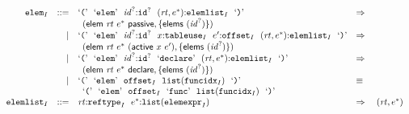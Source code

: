 $$
\begin{array}[t]{@{}lrrl@{}l@{}l@{}l@{}}
& {{\mathtt{elem}}}_{I} & ::= & \mbox{‘\texttt{{(}}’}~~\mbox{‘\texttt{elem}’}~~{{\mathit{id}}^?}{:}{{\mathtt{id}}^?}~~({\mathit{rt}}, {e^\ast}){:}{{\mathtt{elemlist}}}_{I}~~\mbox{‘\texttt{{)}}’} & \quad\Rightarrow\quad{} & & \\
&&& \multicolumn{4}{@{}l@{}}{\quad
\begin{array}[t]{@{}l@{}}
(\mathsf{elem}~{\mathit{rt}}~{e^\ast}~\mathsf{passive}, \{ \mathsf{elems}~({{\mathit{id}}^?}) \}) \\
\end{array}
} \\
& & | & \mbox{‘\texttt{{(}}’}~~\mbox{‘\texttt{elem}’}~~{{\mathit{id}}^?}{:}{{\mathtt{id}}^?}~~x{:}{{\mathtt{tableuse}}}_{I}~~{e'}{:}{{\mathtt{offset}}}_{I}~~({\mathit{rt}}, {e^\ast}){:}{{\mathtt{elemlist}}}_{I}~~\mbox{‘\texttt{{)}}’} & \quad\Rightarrow\quad{} & & \\
&&& \multicolumn{4}{@{}l@{}}{\quad
\begin{array}[t]{@{}l@{}}
(\mathsf{elem}~{\mathit{rt}}~{e^\ast}~(\mathsf{active}~x~{e'}), \{ \mathsf{elems}~({{\mathit{id}}^?}) \}) \\
\end{array}
} \\
& & | & \mbox{‘\texttt{{(}}’}~~\mbox{‘\texttt{elem}’}~~{{\mathit{id}}^?}{:}{{\mathtt{id}}^?}~~\mbox{‘\texttt{declare}’}~~({\mathit{rt}}, {e^\ast}){:}{{\mathtt{elemlist}}}_{I}~~\mbox{‘\texttt{{)}}’} & \quad\Rightarrow\quad{} & & \\
&&& \multicolumn{4}{@{}l@{}}{\quad
\begin{array}[t]{@{}l@{}}
(\mathsf{elem}~{\mathit{rt}}~{e^\ast}~\mathsf{declare}, \{ \mathsf{elems}~({{\mathit{id}}^?}) \}) \\
\end{array}
} \\
& & | & \mbox{‘\texttt{{(}}’}~~\mbox{‘\texttt{elem}’}~~{{\mathtt{offset}}}_{I}~~{\mathtt{list}}({{\mathtt{funcidx}}}_{I})~~\mbox{‘\texttt{{)}}’} & \quad\equiv\quad{} & & \\
&&& \multicolumn{4}{@{}l@{}}{\quad
\begin{array}[t]{@{}l@{}}
\mbox{‘\texttt{{(}}’}~~\mbox{‘\texttt{elem}’}~~{{\mathtt{offset}}}_{I}~~\mbox{‘\texttt{func}’}~~{\mathtt{list}}({{\mathtt{funcidx}}}_{I})~~\mbox{‘\texttt{{)}}’} \\
\end{array}
} \\
& {{\mathtt{elemlist}}}_{I} & ::= & {\mathit{rt}}{:}{{\mathtt{reftype}}}_{I}~~{e^\ast}{:}{\mathtt{list}}({{\mathtt{elemexpr}}}_{I}) & \quad\Rightarrow\quad{} & ({\mathit{rt}}, {e^\ast}) \\

\end{array}$$
